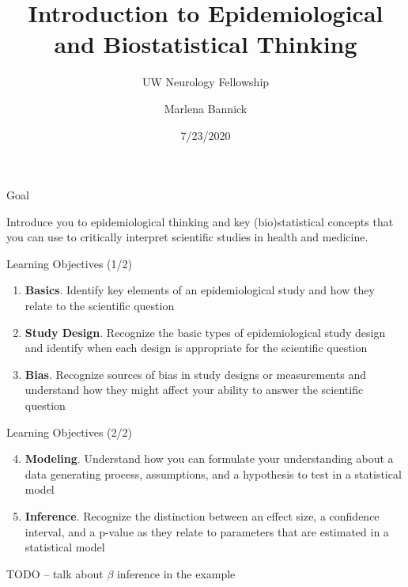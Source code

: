\documentclass[ignorenonframetext,]{beamer}
\title{Introduction to Epidemiological and Biostatistical Thinking}
\subtitle{UW Neurology Fellowship}
\author{Marlena Bannick}
\institute{PhD Student, University of Washington Dept. of Biostatistics\\
Researcher, Institute for Health Metrics and Evaluation}
\date{7/23/2020}
\providecommand{\tightlist}{%
  \setlength{\itemsep}{0pt}\setlength{\parskip}{0pt}}
\begin{document}
\frame{\titlepage}

\begin{frame}{Goal}
\protect\hypertarget{goal}{}

Introduce you to epidemiological thinking and key (bio)statistical
concepts that you can use to critically interpret scientific studies in
health and medicine.

\end{frame}

\begin{frame}{Learning Objectives (1/2)}
\protect\hypertarget{learning-objectives-12}{}

\begin{enumerate}
\tightlist
\item
  \textbf{Basics}. Identify key elements of an epidemiological study and
  how they relate to the scientific question
\item
  \textbf{Study Design}. Recognize the basic types of epidemiological
  study design and identify when each design is appropriate for the
  scientific question
\item
  \textbf{Bias}. Recognize sources of bias in study designs or
  measurements and understand how they might affect your ability to
  answer the scientific question
\end{enumerate}

\end{frame}

\begin{frame}{Learning Objectives (2/2)}
\protect\hypertarget{learning-objectives-22}{}

\begin{enumerate}
\setcounter{enumi}{3}
\tightlist
\item
  \textbf{Modeling}. Understand how you can formulate your understanding
  about a data generating process, assumptions, and a hypothesis to test
  in a statistical model
\item
  \textbf{Inference}. Recognize the distinction between an effect size,
  a confidence interval, and a p-value as they relate to parameters that
  are estimated in a statistical model
\end{enumerate}

TODO -- talk about \(\beta\) inference in the example

\end{frame}
\end{document}

